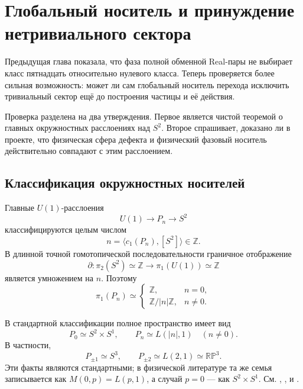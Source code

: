 \chapter{Глобальный носитель и принуждение нетривиального сектора}

Предыдущая глава показала, что фаза полной обменной Real-пары не выбирает
класс пятнадцать относительно нулевого класса. Теперь проверяется более
сильная возможность: может ли сам глобальный носитель перехода исключить
тривиальный сектор ещё до построения частицы и её действия.

Проверка разделена на два утверждения. Первое является чистой теоремой о
главных окружностных расслоениях над $S^2$. Второе спрашивает, доказано ли
в проекте, что физическая сфера дефекта и физический фазовый носитель
действительно совпадают с этим расслоением.

\section{Классификация окружностных носителей}

Главные $U(1)$-расслоения
\begin{equation}
 U(1)\longrightarrow P_n\longrightarrow S^2
\end{equation}
классифицируются целым числом
\begin{equation}
 n=\langle c_1(P_n),[S^2]\rangle\in\mathbb Z.
 \label{eq:v5-carrier-chern-number}
\end{equation}
В длинной точной гомотопической последовательности граничное отображение
\begin{equation}
 \partial:\pi_2(S^2)\simeq\mathbb Z
 \longrightarrow
 \pi_1(U(1))\simeq\mathbb Z
\end{equation}
является умножением на $n$. Поэтому
\begin{equation}
 \pi_1(P_n)\simeq
 \begin{cases}
  \mathbb Z,&n=0,\\
  \mathbb Z/|n|\mathbb Z,&n\ne0.
 \end{cases}
 \label{eq:v5-carrier-fundamental-group}
\end{equation}

В стандартной классификации полное пространство имеет вид
\begin{equation}
 P_0\simeq S^2\times S^1,
 \qquad
 P_n\simeq L(|n|,1)\quad(n\ne0).
 \label{eq:v5-carrier-lens-spaces}
\end{equation}
В частности,
\begin{equation}
 P_{\pm1}\simeq S^3,
 \qquad
 P_{\pm2}\simeq L(2,1)\simeq\mathbb{RP}^3.
 \label{eq:v5-carrier-special-cases}
\end{equation}
Эти факты являются стандартными; в физической литературе та же семья
записывается как $M(0,p)=L(p,1)$, а случай $p=0$ --- как
$S^2\times S^1$. См. ,
,  и
.

